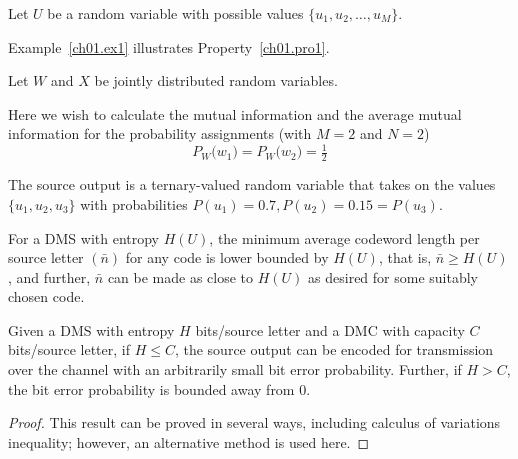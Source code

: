\begin{property}
\label{ch01.pro1}
Let $U$ be a random variable with possible values $\{u_1,u_2,\dots, u_M\}$.
\end{property}

Example~\ref{ch01.ex1} illustrates Property~\ref{ch01.pro1}.

\begin{property}
\label{ch01.pro2}
Let $W$ and $X$ be jointly distributed random variables.
\end{property}

\begin{example}
\label{ch01.ex2}
Here we wish to calculate the mutual information and the average
mutual information for the probability assignments
(with $M=2$ and $N=2$)
\begin{equation}
 P_W \big(w_1\big) = P_W \big(w_2\big) = \tfrac{1}{2}
\label{ch01.eq3}
\end{equation}
\end{example}

\begin{example}
\label{ch01.ex3}
The source output is a ternary-valued random variable that takes on the
values $\{ u_1, u_2, u_3 \}$ with probabilities
$P(u_1) = 0.7, P(u_2) = 0.15 = P(u_3)$. 
\end{example}

\begin{theorem}
\label{ch01.th1}
For a DMS with entropy $H(U)$,
the minimum average codeword length per source letter $(\bar{n})$ for any
code is lower
bounded by $H(U)$, that is, $\bar{n} \geq H(U)$, and further, $\bar{n}$
can be made as close to $H(U)$
as desired for some suitably chosen code.
\end{theorem}

\begin{theorem}
\label{ch01.th2}
Given a DMS
with entropy $H$ bits/source letter and a DMC with capacity $C$
bits/source letter,
if $H \leq C$, the source output can be encoded for transmission over
the channel with
an arbitrarily small bit error probability. Further, if $H > C$, the bit error
probability is bounded away from $0$.
\end{theorem}

\begin{proof}
This result can be proved in several ways, including calculus of
variations~\cite{WenWangetal2005} inequality; however, an
alternative method is used here.
\end{proof}

